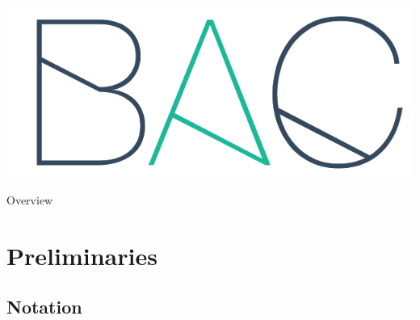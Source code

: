 \documentclass{beamer}
\title[\lecturetitle]{\lecturetitle}
\author[Derek Huang (BAC Advanced Team)]{Derek Huang}
\institute{BAC Advanced Team}
\date{February 27, 2021}
\numberwithin{equation}{section}
\begin{document}
\begin{frame}
    \titlepage
    \centering
    \includegraphics[scale = 0.1]{../bac_logo1.png}
\end{frame}

\begin{frame}{Overview}
    \tableofcontents
\end{frame}

\section{Preliminaries}

\subsection{Notation}
\end{document}
